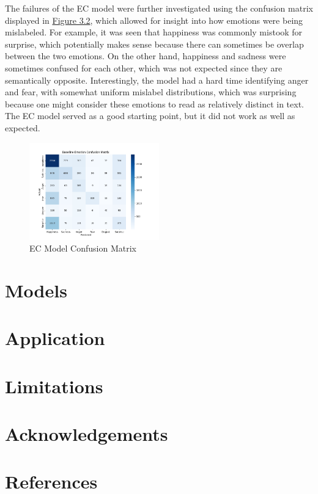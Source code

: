 \documentclass[11pt]{article}
\begin{document}
The failures of the EC model were further investigated using the confusion matrix displayed in \hyperref[fig:baseline_confusion_matrix]{Figure 3.2}, which allowed for insight into how emotions were being mislabeled. For example, it was seen that happiness was commonly mistook for surprise, which potentially makes sense because there can sometimes be overlap between the two emotions. On the other hand, happiness and sadness were sometimes confused for each other, which was not expected since they are semantically opposite. Interestingly, the model had a hard time identifying anger and fear, with somewhat uniform mislabel distributions, which was surprising because one might consider these emotions to read as relatively distinct in text. The EC model served as a good starting point, but it did not work as well as expected.
\renewcommand{\thefigure}{3.2}
\begin{figure}[h]
	\includegraphics[width=0.5\textwidth]{baseline_emotion_confusion_matrix.png}
	\caption{EC Model Confusion Matrix}
	\label{fig:baseline_confusion_matrix}
\end{figure}
\section{Models}

\section{Application}

\section{Limitations}

\section{Acknowledgements}

\section{References}
\end{document}
